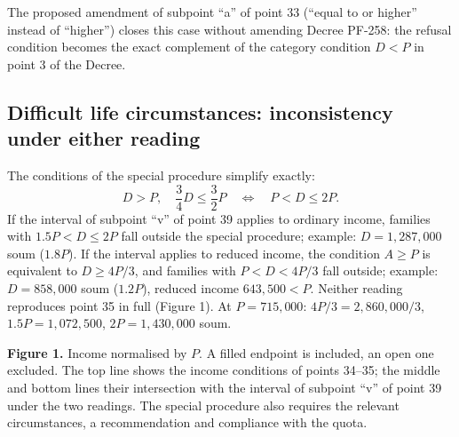 \documentclass[12pt,a4paper]{extarticle}
\begin{document}
The proposed amendment of subpoint “a” of point 33 (“equal to or higher” instead of “higher”) closes this case without amending Decree PF-258: the refusal condition becomes the exact complement of the category condition $D<P$ in point 3 of the Decree.

\subsection{Difficult life circumstances: inconsistency under either reading}
The conditions of the special procedure simplify exactly:
\begin{equation}
D>P,\quad\frac34D\le\frac32P\quad\Longleftrightarrow\quad P<D\le2P.
\end{equation}
If the interval of subpoint “v” of point 39 applies to ordinary income, families with $1.5P<D\le2P$ fall outside the special procedure; example: $D=1{,}287{,}000$ soum ($1.8P$). If the interval applies to reduced income, the condition $A\ge P$ is equivalent to $D\ge4P/3$, and families with $P<D<4P/3$ fall outside; example: $D=858{,}000$ soum ($1.2P$), reduced income $643{,}500<P$. Neither reading reproduces point 35 in full (Figure 1). At $P=715{,}000$: $4P/3=2{,}860{,}000/3$, $1.5P=1{,}072{,}500$, $2P=1{,}430{,}000$ soum.

\begin{center}
\end{center}
\textbf{Figure 1.} Income normalised by $P$. A filled endpoint is included, an open one excluded. The top line shows the income conditions of points 34–35; the middle and bottom lines their intersection with the interval of subpoint “v” of point 39 under the two readings. The special procedure also requires the relevant circumstances, a recommendation and compliance with the quota.
\end{document}
